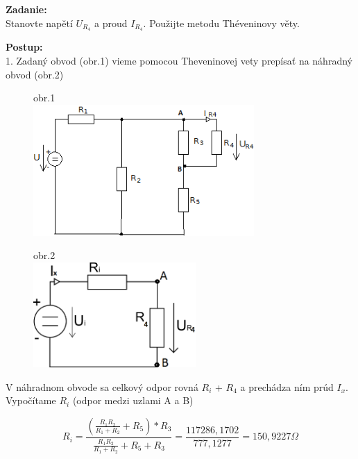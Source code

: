 \documentclass[a4paper,12pt]{article}
\begin{document}
\begin{flushleft}
\textbf{Zadanie:}\\
Stanovte napětí $U_{R_4}$ a proud $I_{R_4}$. Použijte metodu Théveninovy věty.
\end{flushleft}
\begin{flushleft}
\textbf{Postup:} \\ 
1. Zadaný obvod (obr.1) vieme pomocou Theveninovej vety prepísať na náhradný obvod (obr.2) \\
\end{flushleft}
\begin{figure}[!h]
  \centering
  obr.1\\
  \bigskip
  \includegraphics[height=5cm]{obrazky/pr2a} \\
  \bigskip
\end{figure}

\begin{figure}[!h]
  \centering
  obr.2\\
  \includegraphics[height=4cm]{obrazky/pr2b}
\end{figure}
\begin{flushleft}
V náhradnom obvode sa celkový odpor rovná $R_i$ + $R_4$ a prechádza ním prúd $I_x$. Vypočítame $R_i$ (odpor medzi uzlami A a B)
\end{flushleft}
\begin{equation*}
R_{i} = \frac{(\frac{R_1R_2}{R_1+R_2} + R_5)*R_3}{\frac{R_1R_2}{R_1+R_2}+R_5+R_3} = \frac{117286,1702}{777,1277} = 150,9227\Omega
\end{equation*}
\end{document}
